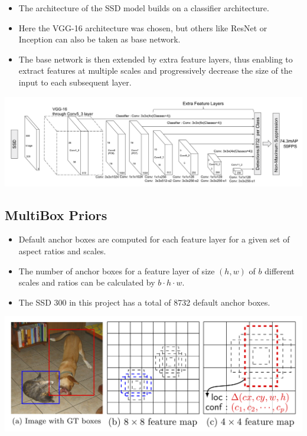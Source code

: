 \documentclass[a0, portrait]{a0poster}
\begin{document}
\begin{multicols}{3}
\begin{itemize}
  \item The architecture of the SSD model builds on a classifier architecture.
  \item Here the VGG-16 architecture was chosen, but others like ResNet or Inception can also be taken as base network.
  \item The base network is then extended by extra feature layers, thus enabling to extract features at multiple scales and progressively decrease the size of the input to each subsequent layer.
\end{itemize}

\begin{center}\vspace{1cm}
  \includegraphics[width=1.0\linewidth]{ssd_architecture.png}
\end{center}

\subsection*{MultiBox Priors}

\begin{itemize}
  \item Default anchor boxes are computed for each feature layer for a given set of aspect ratios and scales.
  \item The number of anchor boxes for a feature layer of size $(h, w)$ of $b$ different scales and ratios can be calculated by $b \cdot h \cdot w$.
  \item The SSD 300 in this project has a total of 8732 default anchor boxes.
\end{itemize}

\begin{center}\vspace{1cm}
  \includegraphics[width=1.0\linewidth]{default_anchor_boxes.png}
\end{center}


\end{multicols}
\end{document}
